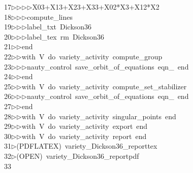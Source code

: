 \begin{tabbing}
17\>$\triangleright$\>$\triangleright$\>$\triangleright$\>$\triangleright$\>X03+X13+X23+X33+X02*X3+X12*X2\ \\[0pt]
18\>$\triangleright$\>$\triangleright$\>$\triangleright$\>compute\_lines\ \\[0pt]
19\>$\triangleright$\>$\triangleright$\>$\triangleright$\>label\_txt\ Dickson36\ \\[0pt]
20\>$\triangleright$\>$\triangleright$\>$\triangleright$\>label\_tex\ rm\ Dickson36\ \\[0pt]
21\>$\triangleright$\>$\triangleright$\>end\ \\[0pt]
22\>$\triangleright$\>$\triangleright$\>with\ V\ do\ variety\_activity\ compute\_group\ \\[0pt]
23\>$\triangleright$\>$\triangleright$\>$\triangleright$\>nauty\_control\ save\_orbit\_of\_equations\ eqn\_\ end\ \\[0pt]
24\>$\triangleright$\>$\triangleright$\>end\ \\[0pt]
25\>$\triangleright$\>$\triangleright$\>with\ V\ do\ variety\_activity\ compute\_set\_stabilizer\ \\[0pt]
26\>$\triangleright$\>$\triangleright$\>$\triangleright$\>nauty\_control\ save\_orbit\_of\_equations\ eqn\_\ end\ \\[0pt]
27\>$\triangleright$\>$\triangleright$\>end\ \\[0pt]
28\>$\triangleright$\>$\triangleright$\>with\ V\ do\ variety\_activity\ singular\_points\ end\ \\[0pt]
29\>$\triangleright$\>$\triangleright$\>with\ V\ do\ variety\_activity\ export\ end\ \\[0pt]
30\>$\triangleright$\>$\triangleright$\>with\ V\ do\ variety\_activity\ report\ end\\[0pt]
31\>$\triangleright$\>(PDFLATEX)\ variety\_Dickson36\_reporttex\\[0pt]
32\>$\triangleright$\>(OPEN)\ variety\_Dickson36\_reportpdf\\[0pt]
33\>\end{tabbing}
